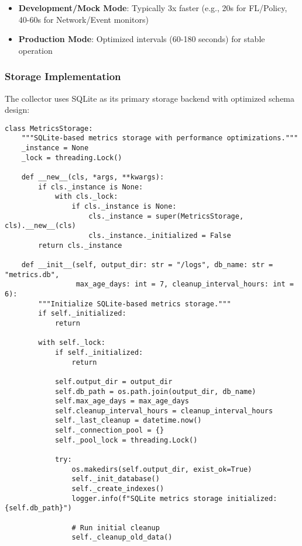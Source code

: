 \begin{itemize}
    \item \textbf{Development/Mock Mode}: Typically 3x faster (e.g., 20s for FL/Policy, 40-60s for Network/Event monitors)
    \item \textbf{Production Mode}: Optimized intervals (60-180 seconds) for stable operation
\end{itemize}

\subsubsection{Storage Implementation}

The collector uses SQLite as its primary storage backend with optimized schema design:

\begin{lstlisting}[style=pythoncode, caption=Time Series Storage Implementation]
class MetricsStorage:
    """SQLite-based metrics storage with performance optimizations."""
    _instance = None
    _lock = threading.Lock()

    def __new__(cls, *args, **kwargs):
        if cls._instance is None:
            with cls._lock:
                if cls._instance is None:
                    cls._instance = super(MetricsStorage, cls).__new__(cls)
                    cls._instance._initialized = False
        return cls._instance

    def __init__(self, output_dir: str = "/logs", db_name: str = "metrics.db", 
                 max_age_days: int = 7, cleanup_interval_hours: int = 6):
        """Initialize SQLite-based metrics storage."""
        if self._initialized:
            return

        with self._lock:
            if self._initialized:
                return

            self.output_dir = output_dir
            self.db_path = os.path.join(output_dir, db_name)
            self.max_age_days = max_age_days
            self.cleanup_interval_hours = cleanup_interval_hours
            self._last_cleanup = datetime.now()
            self._connection_pool = {}
            self._pool_lock = threading.Lock()

            try:
                os.makedirs(self.output_dir, exist_ok=True)
                self._init_database()
                self._create_indexes()
                logger.info(f"SQLite metrics storage initialized: {self.db_path}")
                
                # Run initial cleanup
                self._cleanup_old_data()
                

\end{lstlisting}
